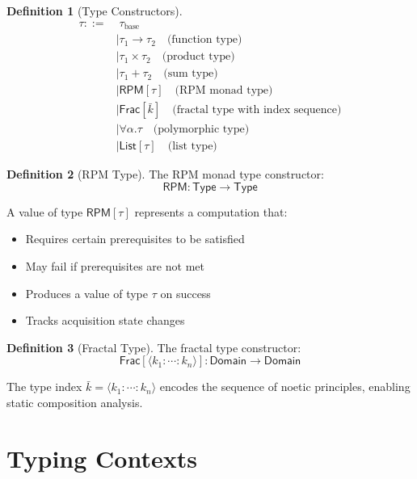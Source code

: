 \documentclass[11pt,twoside,openright]{book}
\theoremstyle{definition}
\newtheorem{definition}{Definition}[chapter]
\theoremstyle{plain}
\theoremstyle{remark}
\begin{document}
\begin{definition}[Type Constructors]
\label{def:type-constructors}
\begin{align}
\tau ::=&\; \tau_{\text{base}} \\
       &\mid \tau_1 \to \tau_2 \quad \text{(function type)} \\
       &\mid \tau_1 \times \tau_2 \quad \text{(product type)} \\
       &\mid \tau_1 + \tau_2 \quad \text{(sum type)} \\
       &\mid \mathsf{RPM}[\tau] \quad \text{(RPM monad type)} \\
       &\mid \mathsf{Frac}[\bar{k}] \quad \text{(fractal type with index sequence)} \\
       &\mid \forall \alpha. \tau \quad \text{(polymorphic type)} \\
       &\mid \mathsf{List}[\tau] \quad \text{(list type)}
\end{align}
\end{definition}

\begin{definition}[RPM Type]
\label{def:rpm-type}
The RPM monad type constructor:
\[
\mathsf{RPM} : \mathsf{Type} \to \mathsf{Type}
\]

A value of type $\mathsf{RPM}[\tau]$ represents a computation that:
\begin{itemize}
\item Requires certain prerequisites to be satisfied
\item May fail if prerequisites are not met
\item Produces a value of type $\tau$ on success
\item Tracks acquisition state changes
\end{itemize}
\end{definition}

\begin{definition}[Fractal Type]
\label{def:fractal-type}
The fractal type constructor:
\[
\mathsf{Frac}[\langle k_1 : \cdots : k_n \rangle] : \mathsf{Domain} \to \mathsf{Domain}
\]

The type index $\bar{k} = \langle k_1 : \cdots : k_n \rangle$ encodes the sequence of noetic principles, enabling static composition analysis.
\end{definition}

\section{Typing Contexts}
\end{document}

